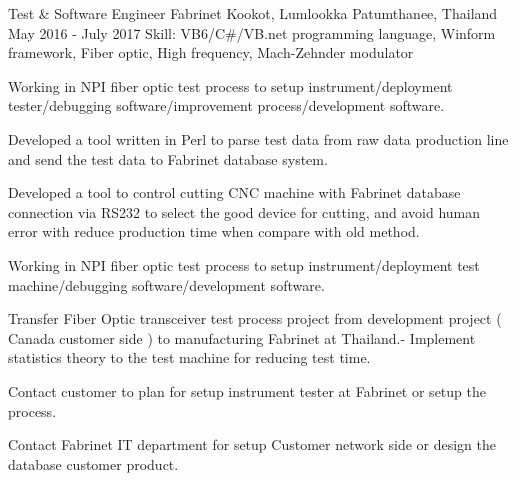 \begin{cventries}
  \cventry
    {Test \& Software Engineer} %
    {Fabrinet} %
    {Kookot, Lumlookka Patumthanee, Thailand} %
    {May 2016 - July 2017} %
    {Skill: VB6/C\#/VB.net programming language, Winform framework, Fiber optic, High frequency, Mach-Zehnder modulator} %
    {
      \begin{cvitems} %
         \item {Working in NPI fiber optic test process to setup
           instrument/deployment tester/debugging software/improvement
           process/development software.}
         \item {Developed a tool written in Perl to parse test data from raw data production line and send the test
         data to Fabrinet database system.}
         \item {Developed a tool to control cutting CNC machine with Fabrinet database connection via
           RS232 to select the good device for cutting, and avoid human error with reduce production time
           when compare with old method.}
         \item {Working in NPI fiber optic test process to setup instrument/deployment test machine/debugging
         software/development software.}
         \item {Transfer Fiber Optic transceiver test process project from development project ( Canada customer
                side ) to manufacturing Fabrinet at Thailand.- Implement statistics theory to
                 the test machine for reducing test time.}
         \item {Contact customer to plan for setup instrument tester at Fabrinet or
                setup the process.}
         \item {Contact Fabrinet IT department for setup Customer network side or
                design the database customer product.}
      \end{cvitems}
    }


\end{cventries}
